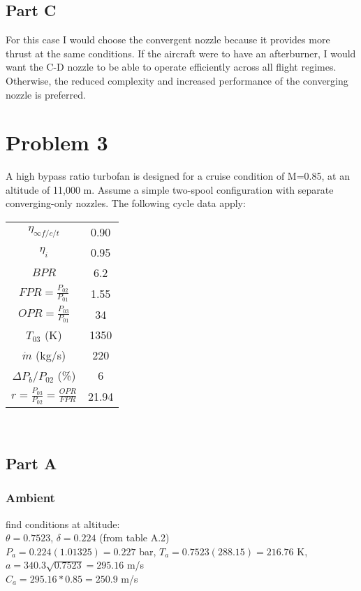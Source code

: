 \documentclass{article}
\begin{document}
\subsection*{Part C}
For this case I would choose the convergent nozzle because it provides more thrust
at the same conditions. If the aircraft were to have an afterburner, I would want the C-D
nozzle to be able to operate efficiently across all flight regimes. Otherwise, the reduced
complexity and increased performance of the converging nozzle is preferred.

\section*{Problem 3}
A high bypass ratio turbofan is designed for a cruise condition of M=0.85, at
an altitude of 11,000 m. Assume a simple two-spool configuration with separate
converging-only nozzles. The following cycle data apply:
\begin{center}
\begin{tabular}{cc}
    $\eta_{\infty f/c/t}$ & 0.90 \\
    $\eta_i$ & 0.95 \\
    $BPR$ & 6.2 \\
    $FPR=\frac{P_{02}}{P_{01}}$ & 1.55 \\
    $OPR=\frac{P_{03}}{P_{01}}$ & 34 \\
    $T_{03}$ (K) & 1350 \\
    $\dot{m}$ (kg/s) & 220 \\
    $\Delta P_b/P_{02}$ (\%) & 6 \\
    $r=\frac{P_{03}}{P_{02}}=\frac{OPR}{FPR}$ & 21.94
\end{tabular} \\
\end{center}

\subsection*{Part A}
\subsubsection*{Ambient}
find conditions at altitude: \\
$\theta=0.7523$, $\delta=0.224$ (from table A.2) \\
$P_a=0.224(1.01325)=0.227$ bar, $T_a=0.7523(288.15)=216.76$ K,
$a=340.3\sqrt{0.7523}=295.16$ m/s \\
$C_a=295.16*0.85=250.9$ m/s
\end{document}
